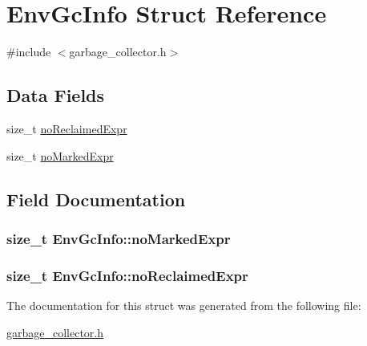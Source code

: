 \hypertarget{structEnvGcInfo}{\section{Env\+Gc\+Info Struct Reference}
\label{structEnvGcInfo}
}


{\ttfamily \#include $<$garbage\+\_\+collector.\+h$>$}

\subsection*{Data Fields}
\begin{DoxyCompactItemize}
\item 
size\+\_\+t \hyperlink{structEnvGcInfo_a667fc98f252b80deefd6874b1bfdc6b0}{no\+Reclaimed\+Expr}
\item 
size\+\_\+t \hyperlink{structEnvGcInfo_ae834164a4c627e76266b25b8dd2a9999}{no\+Marked\+Expr}
\end{DoxyCompactItemize}


\subsection{Field Documentation}
\hypertarget{structEnvGcInfo_ae834164a4c627e76266b25b8dd2a9999}{
\subsubsection[{no\+Marked\+Expr}]{\setlength{\rightskip}{0pt plus 5cm}size\+\_\+t Env\+Gc\+Info\+::no\+Marked\+Expr}}\label{structEnvGcInfo_ae834164a4c627e76266b25b8dd2a9999}
\hypertarget{structEnvGcInfo_a667fc98f252b80deefd6874b1bfdc6b0}{
\subsubsection[{no\+Reclaimed\+Expr}]{\setlength{\rightskip}{0pt plus 5cm}size\+\_\+t Env\+Gc\+Info\+::no\+Reclaimed\+Expr}}\label{structEnvGcInfo_a667fc98f252b80deefd6874b1bfdc6b0}


The documentation for this struct was generated from the following file\+:\begin{DoxyCompactItemize}
\item 
\hyperlink{garbage__collector_8h}{garbage\+\_\+collector.\+h}\end{DoxyCompactItemize}
